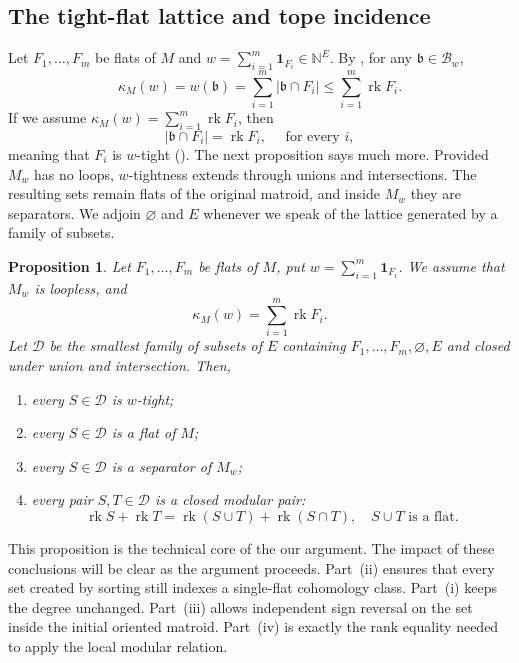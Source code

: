 \documentclass[10pt]{amsart}
\theoremstyle{plain}
\newtheorem{proposition}[theorem]{Proposition}
\theoremstyle{definition}
\newcommand{\one}{\mathbf{1}}
\newcommand{\NN}{\mathbb{N}}
\newcommand{\B}{\mathcal{B}}
\newcommand{\D}{\mathcal{D}}
\newcommand{\rk}{\operatorname{rk}}
\newcommand{\bb}{\mathfrak{b}}
\begin{document}
\subsection{The tight-flat lattice and tope incidence}

Let $F_1,\ldots,F_m$ be flats of $M$ and $w=\sum_{i=1}^m\one_{F_i}\in\NN^E$. By , for any $\bb\in\B_w$,
\[
\kappa_M(w)=w(\bb)=\sum_{i=1}^m|\bb\cap F_i|\leq\sum_{i=1}^m\rk F_i.
\]
If we assume $\kappa_M(w)=\sum_{i=1}^m\rk F_i$, then 
\begin{equation}\label{flat-is-tight}
|\bb\cap F_i|=\rk F_i,\quad \text{ for every } i,
\end{equation}
meaning that $F_i$ is $w$-tight (). The next proposition says much more. Provided $M_w$ has no loops, $w$-tightness extends through unions and intersections. The resulting sets remain flats of the original matroid, and inside $M_w$ they are separators. We adjoin $\varnothing$ and $E$ whenever we speak of the lattice generated by a family of subsets.

\begin{proposition}\label{tight-flat-lattice}
Let $F_1,\ldots,F_m$ be flats of $M$, put $w=\sum_{i=1}^m\one_{F_i}$. We assume that $M_w$ is loopless, and
\begin{equation}\label{tight-degree}
\kappa_M(w)=\sum_{i=1}^m\rk F_i.
\end{equation}
Let $\D$ be the smallest family of subsets of $E$ containing $F_1,\ldots,F_m,\varnothing,E$ and closed under union and intersection. Then,
\begin{enumerate}[label=\textup{(\roman*)}]
\item every $S\in\D$ is $w$-tight;
\item every $S\in\D$ is a flat of $M$;
\item every $S\in\D$ is a separator of $M_w$;
\item every pair $S,T\in\D$ is a closed modular pair:
\[
\rk S+\rk T=\rk(S\cup T)+\rk(S\cap T),\quad S\cup T\text{ is a flat}.
\]
\end{enumerate}
\end{proposition}

This proposition is the technical core of the our argument. The impact of these conclusions will be clear as the argument proceeds. Part~(ii) ensures that every set created by sorting still indexes a single-flat cohomology class. Part~(i) keeps the degree unchanged. Part~(iii) allows independent sign reversal on the set inside the initial oriented matroid. Part~(iv) is exactly the rank equality needed to apply the local modular relation.
\end{document}
